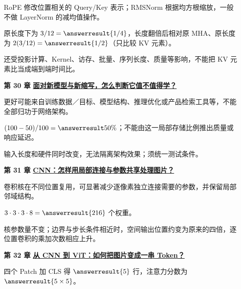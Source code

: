 \begin{enumerate}[leftmargin=5.4em,labelsep=.7em,itemsep=9pt]
RoPE 修改位置相关的 Query/Key 表示；RMSNorm 根据均方根缩放，一般不做 LayerNorm 的减均值操作。
\par{}原长度下为 $3/12=\answerresult{1/4}$，长度翻倍后相对原 MHA、原长度为 $2(3/12)=\answerresult{1/2}$（只比较 KV 元素）。
\par{}还受投影计算、Kernel、访存、批量、序列长度、质量等影响，不能把 KV 元素比当成端到端时间比。
\par{}
\item[\textbf{第 30 章}] \label{answer:23e-tech-judgement}\textbf{\hyperref[check:23e-tech-judgement]{面对新模型与新缩写，怎么判断它值不值得学？}}\par\nobreak
{}更好可能来自训练数据／目标、模型结构、推理优化或产品检索工具等，不能全部归功于网络架构。
\par{}$(100-50)/100=\answerresult{50\%}$；不能由这一局部存储比例推出质量或响应延迟。
\par{}输入长度和硬件同时改变，无法隔离架构效果；须统一测试条件。
\par{}
\item[\textbf{第 31 章}] \label{answer:19-cnn}\textbf{\hyperref[check:19-cnn]{CNN：怎样用局部连接与参数共享处理图片？}}\par\nobreak
{}卷积核在不同位置复用，可显著减少逐像素独立连接需要的参数，并保留局部邻域结构。
\par{}$3\cdot3\cdot3\cdot8=\answerresult{216}$ 个权重。
\par{}核参数量不变；边界与步长条件相近时，空间输出位置约变为原来的四倍，逐位置卷积的乘加次数相应上升。
\par{}
\item[\textbf{第 32 章}] \label{answer:19b-vit}\textbf{\hyperref[check:19b-vit]{从 CNN 到 ViT：如何把图片变成一串 Token？}}\par\nobreak
{}四个 Patch 加 CLS 得 $\answerresult{5}$ 行，注意力分数为 $\answerresult{5\times5}$。

\end{enumerate}
